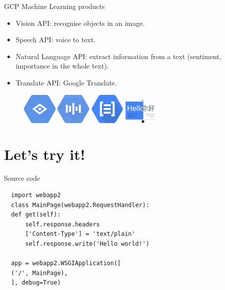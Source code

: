 \documentclass{beamer}
\begin{document}
\begin{frame}[fragile]{GCP Machine Learning products}
  \begin{itemize}[<+->]
    \item Vision API: recognise objects in an image.
    \item Speech API: voice to text.
    \item Natural Language API: extract information from a text (sentiment, importance in the whole text).
    \item Translate API: Google Translate.
  \end{itemize}
  \vspace{1cm}
  \begin{figure}[H]
    \includegraphics[width=0.15\textwidth]{../img/vision}
    \hspace{0.7cm}   \includegraphics[width=0.15\textwidth]{../img/speech}
    \hspace{0.7cm}
     \includegraphics[width=0.15\textwidth]{../img/natural-language}
     \hspace{0.7cm}
     \includegraphics[width=0.15\textwidth]{../img/translate}
  \end{figure}
\end{frame}

\section{Let's try it!}



\begin{frame}[fragile]{Source code}
  \begin{verbatim}
  import webapp2
  class MainPage(webapp2.RequestHandler):
  def get(self):
      self.response.headers
      ['Content-Type'] = 'text/plain'
      self.response.write('Hello world!')

  app = webapp2.WSGIApplication([
  ('/', MainPage),
  ], debug=True)


  \end{verbatim}
\end{frame}
\end{document}
